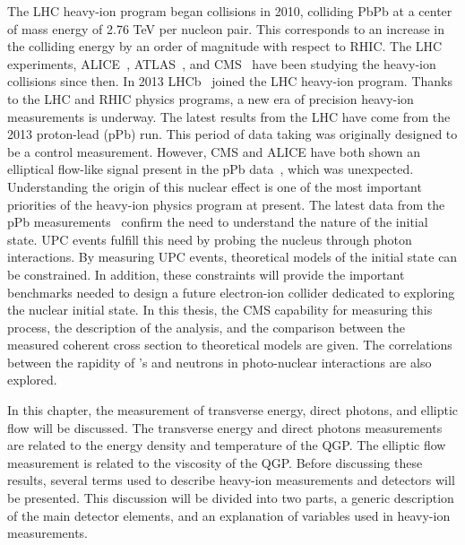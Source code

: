   The LHC heavy-ion program began collisions in 2010, colliding PbPb at 
    a center of mass energy of 2.76 TeV per nucleon pair. 
  This corresponds to an increase in the colliding energy by an order of 
    magnitude with respect to RHIC. 
  The LHC experiments, ALICE~\cite{Aamodt:2008zz}, ATLAS~\cite{Aad:2008zzm}, and CMS~\cite{tCmsE} have been studying the heavy-ion 
    collisions since then. 
  In 2013 LHCb~\cite{Alves:2008zz} joined the LHC heavy-ion program. 
  Thanks to the LHC and RHIC physics programs, a new era of precision
    heavy-ion measurements is underway. 
  The latest results from the LHC have come from the 2013 proton-lead (pPb)
    run.
  This period of data taking was originally designed to be a control 
    measurement.
  However, CMS and ALICE have both shown an elliptical flow-like signal present
    in the pPb data~\cite{Chatrchyan:2013nka,Abelev:2012ola}, which was unexpected.
  Understanding the origin of this nuclear effect is one of the most important
    priorities of the heavy-ion physics program at present. 
  The latest data from the pPb measurements~\cite{Roland:2014jsa} confirm the need to 
    understand the nature of the initial state. 
  UPC events fulfill this need by probing the nucleus through photon 
    interactions.
  By measuring UPC \JPsi{} events, theoretical models of the initial state can 
    be constrained.
  In addition, these constraints will provide the important benchmarks needed 
    to design a future electron-ion collider dedicated to exploring the nuclear
    initial state. 
  In this thesis, the CMS capability for measuring this process, the 
    description of the analysis, and the comparison between the measured 
    coherent \JPsi{} cross section to theoretical models are given.
  The correlations between the rapidity of \JPsi{}'s and neutrons in 
    photo-nuclear interactions are also explored. 

  In this chapter, the measurement of transverse energy, direct photons, and
    elliptic flow will be discussed.
  The transverse energy and direct photons measurements are related to 
    the energy density and temperature of the QGP.
  The elliptic flow measurement is related to the viscosity of the QGP.
  Before discussing these results, several terms used to describe heavy-ion
    measurements and detectors will be presented. 
  This discussion will be divided into two parts, a generic description of 
    the main detector elements, and an explanation of variables used in
    heavy-ion measurements.
  
